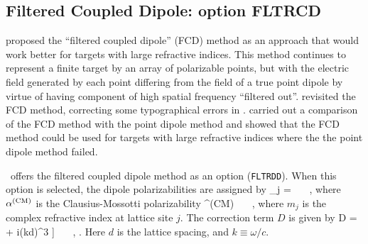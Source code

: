 \subsection{Filtered Coupled Dipole: option FLTRCD}

\citet{Piller+Martin_1998} proposed 
the ``filtered coupled dipole'' (FCD) method as an approach that would work
better for targets with large refractive indices.  This method continues
to represent a finite target by an array of polarizable points, but 
with the electric field generated by each point differing from the
field of a true point dipole by virtue of having component of high
spatial frequency ``filtered out''.
\citet{Gay-Balmaz+Martin_2002} revisited the FCD method, correcting some
typographical errors in \citet{Piller+Martin_1998}.
\citet{Yurkin+Min+Hoekstra_2010} carried out a comparison of the FCD method
with the point dipole method and showed that the FCD method could be used
for targets with large refractive indices where the the point dipole method
failed.

\ddscatv\ offers the filtered coupled dipole method as an option
({\tt FLTRDD}).  When this option is selected, the dipole polarizabilities
are assigned by
\beq
\alpha_j = 
~~~,
\eeq
where $\alpha^{\rm (CM)}$ is the Clausius-Mossotti polarizability
\beq
\alpha^{\rm (CM)} \equiv {}
~~~,
\eeq
where $m_j$ is the complex refractive index at lattice site $j$.
The correction term $D$ is given by
\beq
D = 
              \left[
              \frac{4}{3}(kd)^2+
              \frac{2}{3\pi}\ln\left[\frac{\pi-kd}{\pi+kd}\right]+
              i(kd)^3
              \right]
~~~,
\eeq
\citep[see][eq.\ 9]{Yurkin+Min+Hoekstra_2010}.
Here $d$ is the lattice spacing, and $k\equiv\omega/c$.

